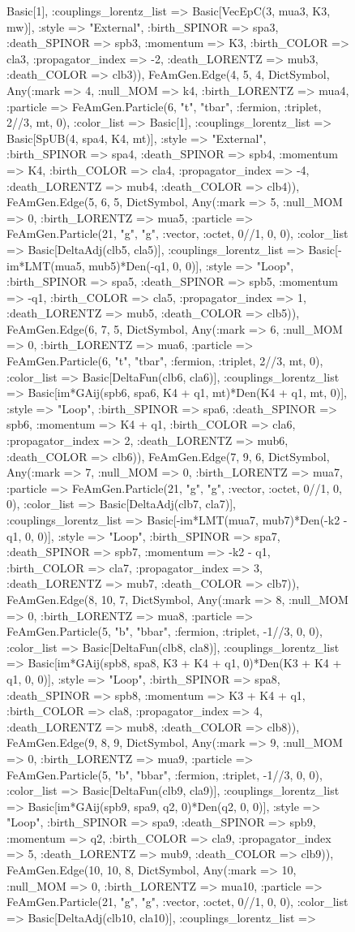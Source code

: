 \documentclass{revtex4}
\begin{document}
\begin{figure}[!htb]
\begin{center}
{Basic[1], :couplings_lorentz_list => Basic[VecEpC(3, mua3, K3, mw)], :style => "External", :birth_SPINOR => spa3, :death_SPINOR => spb3, :momentum => K3, :birth_COLOR => cla3, :propagator_index => -2, :death_LORENTZ => mub3, :death_COLOR => clb3)), FeAmGen.Edge(4, 5, 4, Dict{Symbol, Any}(:mark => 4, :null_MOM => k4, :birth_LORENTZ => mua4, :particle => FeAmGen.Particle(6, "t", "tbar", :fermion, :triplet, 2//3, mt, 0), :color_list => Basic[1], :couplings_lorentz_list => Basic[SpUB(4, spa4, K4, mt)], :style => "External", :birth_SPINOR => spa4, :death_SPINOR => spb4, :momentum => K4, :birth_COLOR => cla4, :propagator_index => -4, :death_LORENTZ => mub4, :death_COLOR => clb4)), FeAmGen.Edge(5, 6, 5, Dict{Symbol, Any}(:mark => 5, :null_MOM => 0, :birth_LORENTZ => mua5, :particle => FeAmGen.Particle(21, "g", "g", :vector, :octet, 0//1, 0, 0), :color_list => Basic[DeltaAdj(clb5, cla5)], :couplings_lorentz_list => Basic[-im*LMT(mua5, mub5)*Den(-q1, 0, 0)], :style => "Loop", :birth_SPINOR => spa5, :death_SPINOR => spb5, :momentum => -q1, :birth_COLOR => cla5, :propagator_index => 1, :death_LORENTZ => mub5, :death_COLOR => clb5)), FeAmGen.Edge(6, 7, 5, Dict{Symbol, Any}(:mark => 6, :null_MOM => 0, :birth_LORENTZ => mua6, :particle => FeAmGen.Particle(6, "t", "tbar", :fermion, :triplet, 2//3, mt, 0), :color_list => Basic[DeltaFun(clb6, cla6)], :couplings_lorentz_list => Basic[im*GAij(spb6, spa6, K4 + q1, mt)*Den(K4 + q1, mt, 0)], :style => "Loop", :birth_SPINOR => spa6, :death_SPINOR => spb6, :momentum => K4 + q1, :birth_COLOR => cla6, :propagator_index => 2, :death_LORENTZ => mub6, :death_COLOR => clb6)), FeAmGen.Edge(7, 9, 6, Dict{Symbol, Any}(:mark => 7, :null_MOM => 0, :birth_LORENTZ => mua7, :particle => FeAmGen.Particle(21, "g", "g", :vector, :octet, 0//1, 0, 0), :color_list => Basic[DeltaAdj(clb7, cla7)], :couplings_lorentz_list => Basic[-im*LMT(mua7, mub7)*Den(-k2 - q1, 0, 0)], :style => "Loop", :birth_SPINOR => spa7, :death_SPINOR => spb7, :momentum => -k2 - q1, :birth_COLOR => cla7, :propagator_index => 3, :death_LORENTZ => mub7, :death_COLOR => clb7)), FeAmGen.Edge(8, 10, 7, Dict{Symbol, Any}(:mark => 8, :null_MOM => 0, :birth_LORENTZ => mua8, :particle => FeAmGen.Particle(5, "b", "bbar", :fermion, :triplet, -1//3, 0, 0), :color_list => Basic[DeltaFun(clb8, cla8)], :couplings_lorentz_list => Basic[im*GAij(spb8, spa8, K3 + K4 + q1, 0)*Den(K3 + K4 + q1, 0, 0)], :style => "Loop", :birth_SPINOR => spa8, :death_SPINOR => spb8, :momentum => K3 + K4 + q1, :birth_COLOR => cla8, :propagator_index => 4, :death_LORENTZ => mub8, :death_COLOR => clb8)), FeAmGen.Edge(9, 8, 9, Dict{Symbol, Any}(:mark => 9, :null_MOM => 0, :birth_LORENTZ => mua9, :particle => FeAmGen.Particle(5, "b", "bbar", :fermion, :triplet, -1//3, 0, 0), :color_list => Basic[DeltaFun(clb9, cla9)], :couplings_lorentz_list => Basic[im*GAij(spb9, spa9, q2, 0)*Den(q2, 0, 0)], :style => "Loop", :birth_SPINOR => spa9, :death_SPINOR => spb9, :momentum => q2, :birth_COLOR => cla9, :propagator_index => 5, :death_LORENTZ => mub9, :death_COLOR => clb9)), FeAmGen.Edge(10, 10, 8, Dict{Symbol, Any}(:mark => 10, :null_MOM => 0, :birth_LORENTZ => mua10, :particle => FeAmGen.Particle(21, "g", "g", :vector, :octet, 0//1, 0, 0), :color_list => Basic[DeltaAdj(clb10, cla10)], :couplings_lorentz_list => }
\end{center}
\end{figure}
\end{document}
